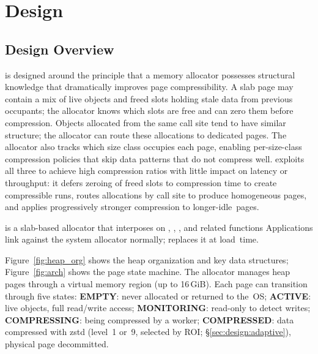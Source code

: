 \section{Design}
\label{sec:design}



\subsection{Design Overview}
\label{sec:design:arch}

\sys is designed around the principle that a memory allocator
possesses structural knowledge that dramatically improves page
compressibility.  A slab page may contain a mix of live objects and
freed slots holding stale data from previous occupants; the allocator
knows which slots are free and can zero them before compression.
Objects allocated from the same call site tend to have similar
structure; the allocator can route these allocations to dedicated
pages.  The allocator also tracks which size class occupies each page,
enabling per-size-class compression policies that skip data patterns
that do not compress well.  \sys exploits all three to achieve high
compression ratios with little impact on latency or throughput: it
defers zeroing of freed slots to compression time to
create compressible runs, routes allocations by call site to produce
homogeneous pages, and applies progressively stronger compression to
longer-idle~pages.

\sys is a slab-based allocator that interposes on ,
, , and related functions 
Applications link against the system allocator normally; \sys
replaces it at load~time.

Figure~\ref{fig:heap_org} shows the heap organization and key data
structures; Figure~\ref{fig:arch} shows the page state machine.  The
allocator manages heap pages through a virtual memory region (up to
16\,GiB).  Each page can transition through five states:
\textbf{EMPTY}: never allocated or returned to the~OS;
\textbf{ACTIVE}: live objects, full read/write access;
\textbf{MONITORING}: read-only to detect writes;
\textbf{COMPRESSING}: being compressed by a worker;
\textbf{COMPRESSED}: data compressed with zstd
  (level~1 or~9, selected by ROI; \S\ref{sec:design:adaptive}),
  physical page decommitted.

